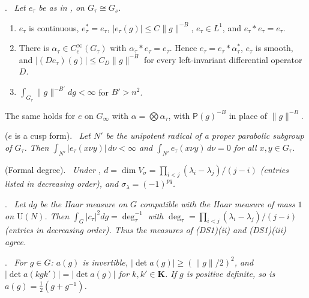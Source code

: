 \documentclass[10pt]{amsart}
\theoremstyle{definition}
\theoremstyle{remark}
\providecommand{\auU}{\mathrm U}
\providecommand{\pbdeg}{\operatorname{deg}}
\providecommand{\pdsK}{\mathbf K}
\providecommand{\pmP}{\mathsf P}
\newenvironment{quotedthm}[2]{\par\medskip\noindent\begingroup
  \textbf{#1}#2.\ \itshape\ignorespaces}{\endgroup\par\medskip}
\begin{document}
\begin{quotedthm}{\cite[Lemma~4.7]{P51}}{}
Let $e_\tau$ be as in {\cite[(42)]{P51}}, on $G_\tau\cong G_s$.
\begin{enumerate}
\item[(a)] $e_\tau$ is continuous, $e_\tau^*=e_\tau$, $|e_\tau(g)|\le C\|g\|^{-B}$,
$e_\tau\in L^1$, and $e_\tau*e_\tau=e_\tau$.
\item[(b)] There is $\alpha_\tau\in C_c^\infty(G_\tau)$ with $\alpha_\tau*e_\tau=e_\tau$. Hence
$e_\tau=e_\tau*\alpha_\tau^*$, $e_\tau$ is smooth, and $|(De_\tau)(g)|\le C_D\|g\|^{-B}$ for every
left-invariant differential operator $D$.
\item[(c)] $\int_{G_\tau}\|g\|^{-B'}dg<\infty$ for $B'>n^2$.
\end{enumerate}
The same holds for $e$ on $G_\infty$ with $\alpha=\bigotimes\alpha_\tau$, with $\pmP(g)^{-B}$ in place
of $\|g\|^{-B}$.
\end{quotedthm}

\begin{quotedthm}{\cite[Lemma~4.8]{P51}}{ ($e$ is a cusp form)}
Let $N'$ be the unipotent radical of a proper parabolic subgroup of $G_\tau$. Then
$\int_{N'}|e_\tau(x\nu y)|\,d\nu<\infty$ and $\int_{N'}e_\tau(x\nu y)\,d\nu=0$ for all $x,y\in G_\tau$.
\end{quotedthm}

\begin{quotedthm}{\cite[Corollary~4.43]{P51}}{ (Formal degree)}
Under {\cite[(49)]{P51}}, $d=\dim V_\sigma=\prod_{i<j}(\lambda_i-\lambda_j)/(j-i)$ (entries listed in
decreasing order), and $\sigma_\lambda=(-1)^{pq}$.
\end{quotedthm}

\begin{quotedthm}{\cite[Proposition~5.2]{P51}}{}
Let $dg$ be the Haar measure on $G$ compatible with the Haar measure of mass $1$ on $\auU(N)$. Then
$\int_G|c_\tau|^2dg=\pbdeg_\tau^{-1}$ with $\pbdeg_\tau=\prod_{i<j}(\lambda_i-\lambda_j)/(j-i)$
(entries in decreasing order). Thus the measures of \textup{(DS1)(ii)} and \textup{(DS1)(iii)} agree.
\end{quotedthm}

\begin{quotedthm}{\cite[Lemma~5.4]{P51}}{}
For $g\in G$: $a(g)$ is invertible, $|\det a(g)|\ge(\|g\|/2)^2$, and $|\det a(kgk')|=|\det a(g)|$ for
$k,k'\in\pdsK$. If $g$ is positive definite, so is $a(g)=\frac12(g+g^{-1})$.
\end{quotedthm}
\end{document}

